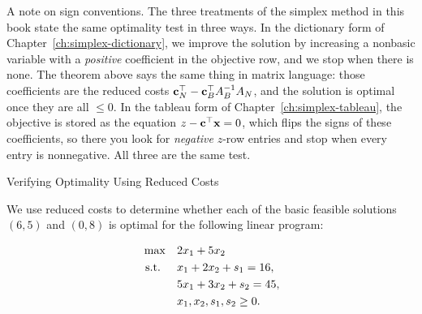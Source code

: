 \label{par:matrix-sign-conventions}%
A note on sign conventions.  The three treatments of the simplex method in this book state the same optimality test in three ways.  In the dictionary form of Chapter~\ref{ch:simplex-dictionary}, we improve the solution by increasing a nonbasic variable with a \emph{positive} coefficient in the objective row, and we stop when there is none.  The theorem above says the same thing in matrix language: those coefficients are the reduced costs $\mathbf{c}_N^\top -\mathbf{c}_B^\top A_B^{-1} A_N$, and the solution is optimal once they are all $\leq 0$.  In the tableau form of Chapter~\ref{ch:simplex-tableau}, the objective is stored as the equation $z - \mathbf{c}^\top\mathbf{x} = 0$, which flips the signs of these coefficients, so there you look for \emph{negative} $z$-row entries and stop when every entry is nonnegative.  All three are the same test.

\begin{example}{Verifying Optimality Using Reduced Costs}{}

We use reduced costs to determine whether each of the basic feasible solutions \( (6,5) \) and \( (0,8) \) is optimal for the following linear program:

\[
\begin{aligned}
    \max \quad & 2 x_1 + 5 x_2 \\
    \mbox{ s.t. } \quad 
    & x_1 + 2x_2 + s_1 = 16, \\
    & 5x_1 + 3x_2 + s_2 = 45, \\
    & x_1, x_2, s_1, s_2 \geq 0.
\end{aligned}
\]
\end{example}

